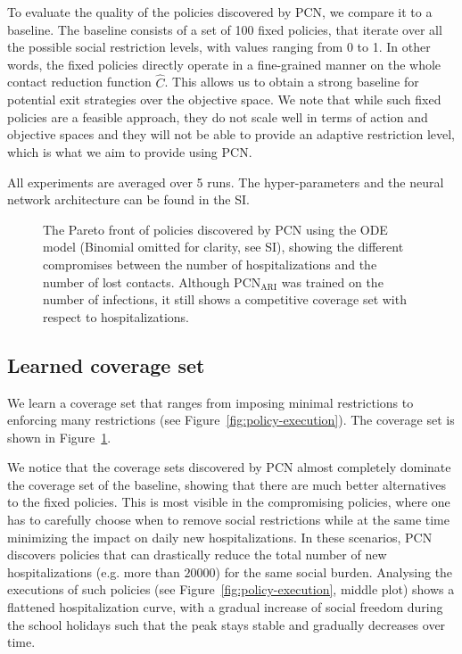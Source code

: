 \documentclass{article}
\begin{document}
To evaluate the quality of the policies discovered by PCN, we compare it to a baseline. The baseline consists of a set of 100 fixed policies, that iterate over all the possible social restriction levels, with values ranging from 0 to 1. In other words, the fixed policies directly operate in a fine-grained manner on the whole contact reduction function $\hat{C}$. This allows us to obtain a strong baseline for potential exit strategies over the objective space. We note that while such fixed policies are a feasible approach, they do not scale well in terms of action and objective spaces and they will not be able to provide an adaptive restriction level, which is what we aim to provide using PCN.

All experiments are averaged over 5 runs. The hyper-parameters and the neural network architecture can be found in the SI.

\begin{figure}
    \centering
    
    \caption{The Pareto front of policies discovered by PCN using the ODE model (Binomial omitted for clarity, see SI), showing the different compromises between the number of hospitalizations and the number of lost contacts. Although $\text{PCN}_\text{ARI}$ was trained on the number of infections, it still shows a competitive coverage set with respect to hospitalizations.}
    \label{fig:pareto-front}
\end{figure}


\subsection{Learned coverage set}

We learn a coverage set that ranges from imposing minimal restrictions to enforcing many restrictions (see Figure~\ref{fig:policy-execution}). The coverage set is shown in Figure~\ref{fig:pareto-front}.

We notice that the coverage sets discovered by PCN almost completely dominate the coverage set of the baseline, showing that there are much better alternatives to the fixed policies. This is most visible in the compromising policies, where one has to carefully choose when to remove social restrictions while at the same time minimizing the impact on daily new hospitalizations. In these scenarios, PCN discovers policies that can drastically reduce the total number of new hospitalizations (e.g. more than $20000$) for the same social burden. Analysing the executions of such policies (see Figure~\ref{fig:policy-execution}, middle plot) shows a flattened hospitalization curve, with a gradual increase of social freedom during the school holidays such that the peak stays stable and gradually decreases over time.
\end{document}
